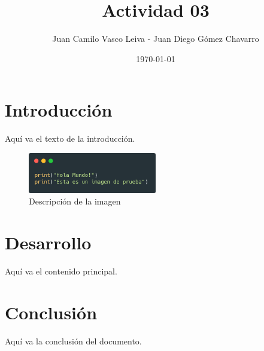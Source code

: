 \documentclass[a4paper,12pt]{article} %
\title{Actividad 03}
\author{Juan Camilo Vasco Leiva - Juan Diego G\'omez Chavarro}
\date{\today} %
\begin{document}
	
	\maketitle  %
	
	\section{Introducción}
	Aquí va el texto de la introducción.
	
	\begin{figure}[h]
		\centering
		\includegraphics[width=0.5\textwidth]{imagenes/imagenPrueba.png}
		\caption{Descripción de la imagen}
		\label{fig:ejemplo}
	\end{figure}
	
	\section{Desarrollo}
	Aquí va el contenido principal.
	
	\section{Conclusión}
	Aquí va la conclusión del documento.
	
\end{document}
